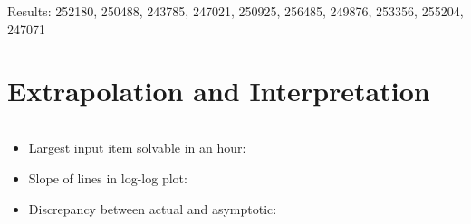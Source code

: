 \documentclass[letterpaper,10pt,titlepage,fleqn]{article}
\begin{document}
Results:
252180, 250488, 243785, 247021, 250925, 256485, 249876, 253356, 255204, 247071

\section*{Extrapolation and Interpretation}
\hrule
\begin{itemize}
\item Largest input item solvable in an hour:
\item Slope of lines in log-log plot:
\item Discrepancy between actual and asymptotic:
\end{itemize}
\end{document}
